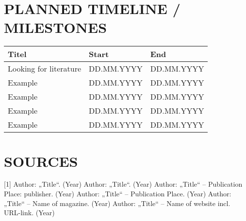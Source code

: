 \section{PLANNED TIMELINE / MILESTONES}

\begin{table}[h!]
  \centering
 \begin{tabularx}{\textwidth}{p{4cm}|p{4cm}|p{4cm}}
   \textbf{Titel} & \textbf{Start} & \textbf{End}\\
   \hline
       Looking for literature    	& DD.MM.YYYY           	& DD.MM.YYYY \\
       Example     						& DD.MM.YYYY  			& DD.MM.YYYY \\
       Example     						& DD.MM.YYYY   			& DD.MM.YYYY \\
       Example	   						& DD.MM.YYYY	 			& DD.MM.YYYY \\
       Example     						& DD.MM.YYYY   			& DD.MM.YYYY
     \end{tabularx}
\end{table}

\vspace{5cm}

\section{SOURCES}
[1]	Author: „Title“. (Year)
\newline
\newline
[2]	Author: „Title“. (Year)
\newline
\newline
[3]	Author: „Title“ – Publication Place: publisher. (Year)
\newline
\newline
[4]	Author: „Title“ – Publication Place. (Year)
\newline
\newline
[5]	Author: „Title“ – Name of magazine. (Year)
\newline
\newline
[6]	Author: „Title“ – Name of website incl. URL-link. (Year)